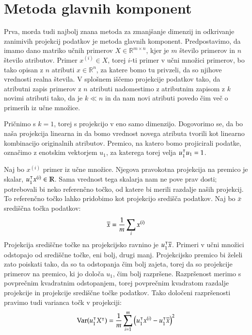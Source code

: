 \begin{figure}[htbp]
\end{figure}

\section{Metoda glavnih komponent}

Prva, morda tudi najbolj znana metoda za zmanjšanje dimenzij in odkrivanje zanimivih projekcij podatkov je metoda glavnih komponent. Predpostavimo, da imamo dano matriko učnih primerov $X\in\mathbb{R}^{m\times n}$, kjer je $m$ število primerov in $n$ število atributov. Primer $x^{(i)}\in X$, torej $i$-ti primer v učni množici primerov, bo tako opisan z $n$ atributi $x\in\mathbb{R}^{n}$, za katere bomo tu privzeli, da so njihove vrednosti realna števila. V splošnem iščemo projekcije podatkov tako, da atributni zapis primerov z $n$ atributi nadomestimo z atributnim zapisom z $k$ novimi atributi tako, da je $k\ll n$ in da nam novi atributi povedo čim več o primerih iz učne množice.

Pričnimo s $k=1$, torej s projekcijo v eno samo dimenzijo. Dogovorimo se, da bo naša projekcija linearna in da bomo vrednost novega atributa tvorili kot linearno kombinacijo originalnih atributov. Premico, na katero bomo projicirali podatke, označimo z enotskim vektorjem $u_1$, za katerega torej velja $u_1^\intercal u_1=1$.

Naj bo $x^{(i)}$ primer iz učne množice. Njegova pravokotna projekcija na premico je skalar, $u_1^\intercal x^{(i)}\in \mathbb{R}$. Sama vrednost tega skalarja nam ne pove prav dosti; potrebovali bi neko referenčno točko, od katere bi merili razdalje naših projekcij. To referenčno točko lahko pridobimo kot projekcijo središča podatkov. Naj bo $\bar{x}$ središčna točka podatkov:
%
$$ \overline{x}=\frac{1}{m}\sum_i x^{(i)}$$
%
Projekcija središčne točke na projekcijsko ravnino je $u_1^\intercal \overline{x}$. Primeri v učni množici odstopajo od središčne točke, eni bolj, drugi manj. Projekcijsko premico bi želeli zato poiskati tako, da so ta odstopanja čim bolj zajeta, torej da so projekcije primerov na premico, ki jo določa $u_1$, čim bolj razpršene. Razpršenost merimo s povprečnim kvadratnim odstopanjem, torej povprečnim kvadratom razdalje projekcije in projekcije središčne točke podatkov. Tako določeni razpršenosti pravimo tudi varianca točk v projekciji:
%
$$ \mathrm{Var}(u_1^\intercal X^\intercal)=\frac{1}{m}\sum_{i=1}^m \big(u_1^\intercal x^{(i)}-u_1^\intercal\overline{x}\big)^2 $$


